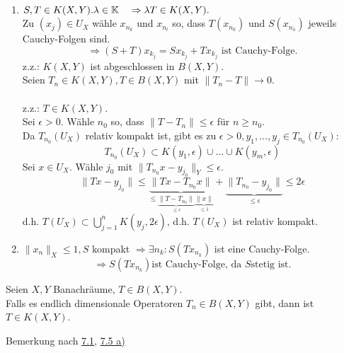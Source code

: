 \begin{beweis}
	\begin{enumerate}[label=\alph*\upshape)]
		\item $S, T \in K(X, Y). \lambda \in \mathbb{K} \quad \Rightarrow \lambda T \in K(X, Y).$ \\
			Zu $(x_j) \in U_X$ wähle $x_{n_{k}}$ und $x_{n_{l}}$ so, dass $T(x_{n_{k}})$ und $S(x_{n_{ö}})$ jeweils Cauchy-Folgen sind. \\
			\[ \Rightarrow (S + T) x_{k_{j}} = S x_{k_{j}} + T x_{k_{j}} \text{ ist Cauchy-Folge.} \] 
			z.z.: $K(X, Y)$ ist abgeschlossen in $B(X, Y)$. \\
			Seien $T_{n} \in K(X, Y), T \in B(X, Y)$ mit $\| T_{n} - T \| \rightarrow 0$. \\ \\
			z.z.: $T \in K(X, Y)$. \\
			Sei $\epsilon > 0$. Wähle $n_{0}$ so, dass $\| T - T_{n} \| \leq \epsilon$ für $n \geq n_{0}$. \\
			Da $T_{n_{0}}(U_{X})$ relativ kompakt ist, gibt es zu $\epsilon > 0, y_{1}, \dotsc, y_{j} \in T_{n_{0}}(U_{X}):$
			\[ T_{n_{0}}(U_{X}) \subset K(y_{1}, \epsilon) \cup \dotsc \cup K(y_{m}, \epsilon) \]
			Sei $x \in U_{X}$. Wähle $j_{0}$ mit $\| T_{n_{0}} x - y_{j_{0}} \|_{Y} \leq \epsilon$.
			\[ \| T x - y_{j_{0}} \| \leq \underbrace{\| T x - T_{n_{0}} x \|}_{\leq \underbrace{\| T - T_{n_{0}} \| }_{\leq \epsilon} \underbrace{\| x \|}_{\leq 1}} + \underbrace{\| T_{n_{0}} - y_{j_{0}} \|}_{\leq \epsilon} \leq 2 \epsilon \]
			d.h. $T(U_{X}) \subset \bigcup_{j = 1}^{n} K(y_{j}, 2 \epsilon)$, d.h. $T(U_{X})$ ist relativ kompakt.
		\item $\| x_{n} \|_{X} \leq 1, S$ kompakt $\Rightarrow \exists n_{k}: S( T x_{n_{k}} ) $ ist eine Cauchy-Folge. 
			\[ \Rightarrow S( T x_{n_{k}} ) \text{ist Cauchy-Folge, da } S \text{stetig ist.} \] 
	\end{enumerate}	
\end{beweis}

\begin{kor} \label{kor:7.6}
	Seien $X, Y$ Banachräume, $T \in B(X, Y)$. \\
	Falls es endlich dimensionale Operatoren $T_{n} \in B(X, Y)$ gibt, dann ist $T \in K(X, Y)$.
	\begin{beweis}
		Bemerkung nach \hyperref[def:7.1-kompktOperator]{7.1}, \hyperref[satz:7-5a]{7.5 a)}	
	\end{beweis}
\end{kor}

